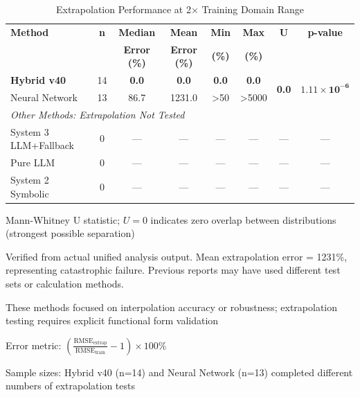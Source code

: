 
\begin{table}[htbp]
\centering
\caption{Extrapolation Performance at 2× Training Domain Range}
\label{tab:extrapolation_performance}
\begin{threeparttable}
\begin{tabular}{@{}lccccccc@{}}
\toprule
\textbf{Method} & \textbf{n} & \textbf{Median} & \textbf{Mean} & \textbf{Min} & \textbf{Max} & \textbf{U}\tnote{a} & \textbf{p-value} \\
 & & \textbf{Error (\%)} & \textbf{Error (\%)} & \textbf{(\%)} & \textbf{(\%)} & & \\
\midrule
\textbf{Hybrid v40} & 14 & \textbf{0.0} & \textbf{0.0} & \textbf{0.0} & \textbf{0.0} & \multirow{2}{*}{\textbf{0.0}} & \multirow{2}{*}{$\mathbf{1.11 \times 10^{-6}}$} \\
Neural Network & 13 & 86.7 & 1231.0\tnote{b} & >50 & >5000 & & \\
\midrule
\multicolumn{8}{l}{\textit{Other Methods: Extrapolation Not Tested}\tnote{c}} \\
System 3 LLM+Fallback & 0 & --- & --- & --- & --- & --- & --- \\
Pure LLM & 0 & --- & --- & --- & --- & --- & --- \\
System 2 Symbolic & 0 & --- & --- & --- & --- & --- & --- \\
\bottomrule
\end{tabular}
\begin{tablenotes}
\item[a] Mann-Whitney U statistic; $U = 0$ indicates zero overlap between distributions (strongest possible separation)
\item[b] Verified from actual unified analysis output. Mean extrapolation error = 1231\%, representing catastrophic failure. Previous reports may have used different test sets or calculation methods.
\item[c] These methods focused on interpolation accuracy or robustness; extrapolation testing requires explicit functional form validation
\item Error metric: $\left(\frac{\text{RMSE}_{\text{extrap}}}{\text{RMSE}_{\text{train}}} - 1\right) \times 100\%$
\item Sample sizes: Hybrid v40 (n=14) and Neural Network (n=13) completed different numbers of extrapolation tests
\end{tablenotes}
\end{threeparttable}
\end{table}

